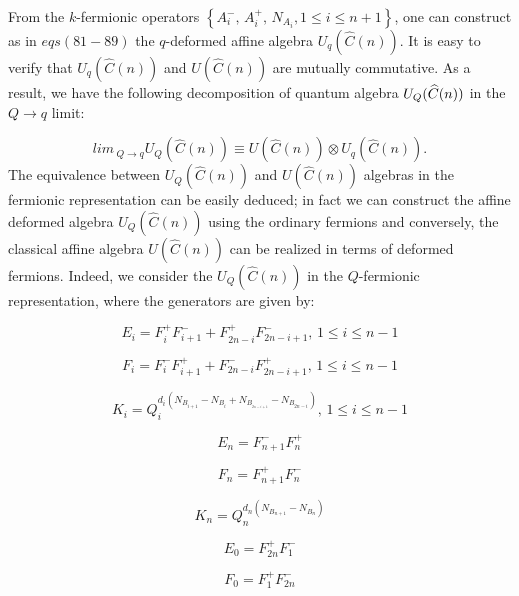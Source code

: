 \documentclass[a4paper,12pt,thmsa]{article}
\begin{document}
From the $k$-fermionic operators $\left\{ A_i^{-},\, A_i^{+},\, %
N_{A_i},1\leq i\leq n+1\right\} $, one can construct as in $eqs(81-89)$ the $%
q$-deformed affine algebra $U_q(\hat C(n))$. It is easy to verify that $U_q(%
\widehat{C}(n))$ and $U(\widehat{C}(n))$ are mutually commutative. As a
result, we have the following decomposition of quantum algebra $U_Q(\widehat{%
C}(n))$ in the $Q\rightarrow q$ limit:

\[
lim\, _{Q\rightarrow q}U_Q(\widehat{C}(n))\equiv U(\widehat{C}%
(n))\otimes U_q(\widehat{C}(n)).
\]
The equivalence between $U_Q(\widehat{C}(n))$ and $U(\widehat{C}(n))$
algebras in the fermionic representation can be easily deduced; in fact we
can construct the affine deformed algebra $U_Q(\widehat{C}(n))$ using the
ordinary fermions and conversely, the classical affine algebra $U(\widehat{C}%
(n))$ can be realized in terms of deformed fermions. Indeed, we consider the
$U_Q(\widehat{C}(n))$ in the $Q$-fermionic representation, where the
generators are given by:

\begin{equation}
E_i=F_i^{+}F_{i+1}^{-}+F_{2n-i}^{+}F_{2n-i+1}^{-},\, 1\leq i\leq
n-1
\end{equation}

\begin{equation}
F_i=F_i^{-}F_{i+1}^{+}+F_{2n-i}^{-}F_{2n-i+1}^{+},\, 1\leq i\leq
n-1
\end{equation}

\begin{equation}
K_i=Q_i^{d_i(N_{B_{i+1}}-N_{B_i}+N_{B_{_{2n-i+1}}}-N_{B_{2n-i}})},\, %
1\leq i\leq n-1
\end{equation}

\begin{equation}
E_{n}=F_{n+1}^{-}F_{n}^{+}
\end{equation}

\begin{equation}
F_{n}=F_{n+1}^{+}F_{n}^{-}
\end{equation}

\begin{equation}
K_{n}=Q_{n}^{d_{n}(N_{B_{n+1}}-N_{B_{n}})}
\end{equation}

\begin{equation}
E_{0}=F_{2n}^{+}F_{1}^{-}
\end{equation}

\begin{equation}
F_{0}=F_{1}^{+}F_{2n}^{-}
\end{equation}
\end{document}
